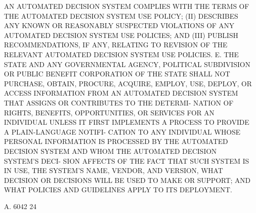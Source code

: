  AN  AUTOMATED  DECISION  SYSTEM COMPLIES WITH THE TERMS OF THE AUTOMATED
 DECISION SYSTEM USE POLICY;
   (II) DESCRIBES ANY KNOWN OR REASONABLY  SUSPECTED  VIOLATIONS  OF  ANY
 AUTOMATED DECISION SYSTEM USE POLICIES; AND
   (III)  PUBLISH  RECOMMENDATIONS,  IF  ANY, RELATING TO REVISION OF THE
 RELEVANT AUTOMATED DECISION SYSTEM USE POLICIES.
   E. THE STATE AND ANY GOVERNMENTAL  AGENCY,  POLITICAL  SUBDIVISION  OR
 PUBLIC  BENEFIT  CORPORATION  OF  THE  STATE SHALL NOT PURCHASE, OBTAIN,
 PROCURE, ACQUIRE, EMPLOY, USE, DEPLOY, OR  ACCESS  INFORMATION  FROM  AN
 AUTOMATED  DECISION  SYSTEM  THAT ASSIGNS OR CONTRIBUTES TO THE DETERMI-
 NATION OF RIGHTS, BENEFITS, OPPORTUNITIES, OR SERVICES FOR AN INDIVIDUAL
 UNLESS IT FIRST IMPLEMENTS A PROCESS TO PROVIDE A PLAIN-LANGUAGE NOTIFI-
 CATION TO ANY INDIVIDUAL WHOSE PERSONAL INFORMATION IS PROCESSED BY  THE
 AUTOMATED DECISION SYSTEM AND WHOM THE AUTOMATED DECISION SYSTEM'S DECI-
 SION  AFFECTS OF THE FACT THAT SUCH SYSTEM IS IN USE, THE SYSTEM'S NAME,
 VENDOR, AND VERSION, WHAT DECISION OR DECISIONS WILL BE USED TO MAKE  OR
 SUPPORT; AND WHAT POLICIES AND GUIDELINES APPLY TO ITS DEPLOYMENT.

 A. 6042                            24
 
